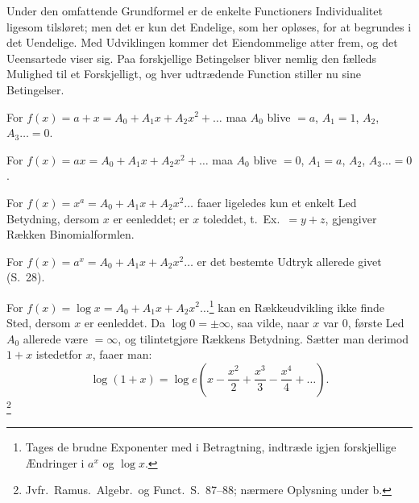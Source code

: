 \documentclass[12pt]{book}
\newcommand{\opage}[1]{\marginnote{\footnotesize\textit{[#1]}}}
\begin{document}
Under den omfattende Grundformel er de enkelte Functioners Individualitet ligesom
tilsløret; men det er kun det Endelige, som her opløses, for at begrundes i det
Uendelige. Med Udviklingen kommer det Eiendommelige atter frem, og det
Ueensartede viser sig. Paa forskjellige Betingelser bliver nemlig den fælleds
Mulighed til et Forskjelligt, og hver udtrædende Function stiller nu sine
Betingelser.

For $f(x) = a+x = A_0 + A_1 x + A_2 x^{2} + \dots$ maa $A_0$ blive $= a$,
$A_1 = 1$, $A_2$, $A_3 \dots = 0$.

For $f(x) = ax = A_0 + A_1 x + A_2 x^{2} + \dots$ maa $A_0$ blive $= 0$,
$A_1 = a$, $A_2$, $A_3 \dots = 0$.

\opage{33} For $f(x) = x^{a} = A_0 + A_1 x + A_2 x^{2}\dots$ faaer ligeledes kun et enkelt
Led Betydning, dersom $x$ er eenleddet; er $x$ toleddet, t.\ Ex.\ $= y+z$,
gjengiver Rækken Binomialformlen.

For $f(x) = a^{x} = A_0 + A_1 x + A_2 x^{2}\dots$ er det bestemte Udtryk allerede
givet (S.\ 28).

For $f(x) = \log x = A_0 + A_1 x + A_2 x^{2}\dots$\footnote{Tages de brudne
Exponenter med i Betragtning, indtræde igjen forskjellige Ændringer i $a^{x}$ og
$\log x$.} kan en Rækkeudvikling ikke finde Sted, dersom $x$ er eenleddet. Da
$\log 0 = \pm\infty$, saa vilde, naar $x$ var 0, første Led $A_0$ allerede være
$= \infty$, og tilintetgjøre Rækkens Betydning. Sætter man derimod $1+x$
istedetfor $x$, faaer man:
\[
\log(1+x) = \log e\left(x - \frac{x^{2}}{2} + \frac{x^{3}}{3} - \frac{x^{4}}{4}
+ \dots\right).
\]\footnote{Jvfr.\ Ramus.\ Algebr.\ og Funct.\ S.\ 87--88; nærmere Oplysning
under b.}
\end{document}
